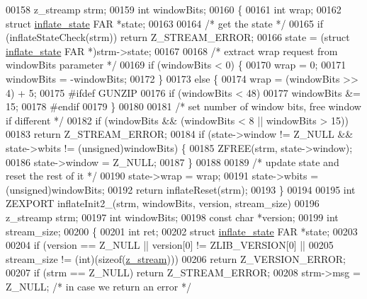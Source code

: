 \begin{DoxyCode}
00158 z\_streamp strm;
00159 \textcolor{keywordtype}{int} windowBits;
00160 \{
00161     \textcolor{keywordtype}{int} wrap;
00162     \textcolor{keyword}{struct }\hyperlink{structinflate__state}{inflate\_state} FAR *state;
00163 
00164     \textcolor{comment}{/* get the state */}
00165     \textcolor{keywordflow}{if} (inflateStateCheck(strm)) \textcolor{keywordflow}{return} Z\_STREAM\_ERROR;
00166     state = (\textcolor{keyword}{struct }\hyperlink{structinflate__state}{inflate\_state} FAR *)strm->state;
00167 
00168     \textcolor{comment}{/* extract wrap request from windowBits parameter */}
00169     if (windowBits < 0) \{
00170         wrap = 0;
00171         windowBits = -windowBits;
00172     \}
00173     \textcolor{keywordflow}{else} \{
00174         wrap = (windowBits >> 4) + 5;
00175 \textcolor{preprocessor}{#ifdef GUNZIP}
00176         \textcolor{keywordflow}{if} (windowBits < 48)
00177             windowBits &= 15;
00178 \textcolor{preprocessor}{#endif}
00179     \}
00180 
00181     \textcolor{comment}{/* set number of window bits, free window if different */}
00182     \textcolor{keywordflow}{if} (windowBits && (windowBits < 8 || windowBits > 15))
00183         \textcolor{keywordflow}{return} Z\_STREAM\_ERROR;
00184     \textcolor{keywordflow}{if} (state->window != Z\_NULL && state->wbits != (\textcolor{keywordtype}{unsigned})windowBits) \{
00185         ZFREE(strm, state->window);
00186         state->window = Z\_NULL;
00187     \}
00188 
00189     \textcolor{comment}{/* update state and reset the rest of it */}
00190     state->wrap = wrap;
00191     state->wbits = (unsigned)windowBits;
00192     \textcolor{keywordflow}{return} inflateReset(strm);
00193 \}
00194 
00195 \textcolor{keywordtype}{int} ZEXPORT inflateInit2\_(strm, windowBits, version, stream\_size)
00196 z\_streamp strm;
00197 \textcolor{keywordtype}{int} windowBits;
00198 \textcolor{keyword}{const} \textcolor{keywordtype}{char} *version;
00199 \textcolor{keywordtype}{int} stream\_size;
00200 \{
00201     \textcolor{keywordtype}{int} ret;
00202     \textcolor{keyword}{struct }\hyperlink{structinflate__state}{inflate\_state} FAR *state;
00203 
00204     \textcolor{keywordflow}{if} (version == Z\_NULL || version[0] != ZLIB\_VERSION[0] ||
00205         stream\_size != (\textcolor{keywordtype}{int})(\textcolor{keyword}{sizeof}(\hyperlink{structz__stream__s}{z\_stream})))
00206         \textcolor{keywordflow}{return} Z\_VERSION\_ERROR;
00207     \textcolor{keywordflow}{if} (strm == Z\_NULL) \textcolor{keywordflow}{return} Z\_STREAM\_ERROR;
00208     strm->msg = Z\_NULL;                 \textcolor{comment}{/* in case we return an error */}

\end{DoxyCode}

